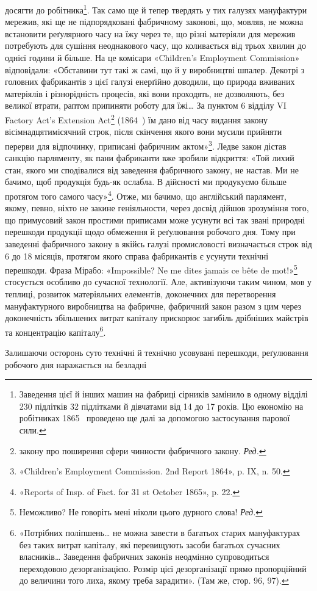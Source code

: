 \parcont{}  %
досягти до робітника\footnote{
Заведення цієї й інших машин на фабриці сірників замінило в
одному відділі  230 підлітків 32 підлітками й дівчатами від 14 до 17 років.
Цю економію на робітниках 1865~ проведено ще далі за допомогою застосування
парової сили.
}. Так само ще й тепер твердять у тих
галузях мануфактури мережив, які ще не підпорядковані фабричному
законові, що, мовляв, не можна встановити реґулярного
часу на їжу через те, що різні матеріяли для мережив потребують
для сушіння неоднакового часу, що коливається від трьох хвилин
до однієї години й більше. На це комісари «Children’s Employment
Commission» відповідали: «Обставини тут такі ж самі, що
й у виробництві шпалер. Декотрі з головних фабрикантів з цієї
галузі енерґійно доводили, що природа вживаних матеріялів і
різнорідність процесів, які вони проходять, не дозволяють, без великої
втрати, раптом припиняти роботу для їжі\dots{} За пунктом 6
відділу VI Factory Act’s Extension Act\footnote*{
закону про поширення сфери чинности фабричного закону. \emph{Ред.}
} (1864~) їм дано від
часу видання закону вісімнадцятимісячний строк, після скінчення
якого вони мусили прийняти перерви для відпочинку,
приписані фабричним актом»\footnote{
«Children’s Employment Commission. 2nd Report 1864», p. IX,
n. 50.
}. Ледве закон дістав санкцію
парляменту, як пани фабриканти вже зробили відкриття: «Той
лихий стан, якого ми сподівалися від заведення фабричного закону,
не настав. Ми не бачимо, щоб продукція будь-як ослабла.
В дійсності ми продукуємо більше протягом того самого часу»\footnote{
«Reports of Insp. of Fact. for 31 st October 1865», p. 22.
}.
Отже, ми бачимо, що англійський парлямент, якому, певно,
ніхто не закине геніяльности, через досвід дійшов зрозуміння
того, що примусовий закон простими приписами може усунути
всі так звані природні перешкоди продукції щодо обмеження
й реґулювання робочого дня. Тому при заведенні фабричного
закону в якійсь галузі промисловості визначається строк від 6
до 18 місяців, протягом якого справа фабрикантів є усунути
технічні перешкоди. Фраза Мірабо: «Impossible? Ne me dites
jamais ce bête de mot!»\footnote*{
Неможливо? Не говоріть мені ніколи цього дурного слова! \emph{Ред.}
} стосується особливо до сучасної технології.
Але, активізуючи таким чином, мов у теплиці, розвиток
матеріяльних елементів, доконечних для перетворення мануфактурного
виробництва на фабричне, фабричний закон разом з
цим через доконечність збільшених витрат капіталу прискорює
загибіль дрібніших майстрів та концентрацію капіталу\footnote{
«Потрібних поліпшень\dots{} не можна завести в багатьох старих
мануфактурах без таких витрат капіталу, які перевищують засоби багатьох
сучасних власників\dots{} Заведення фабричних законів неодмінно
супроводиться переходовою дезорганізацією. Розмір цієї дезорганізації
прямо пропорційний до величини того лиха, якому треба зарадити».
(Там же, стор. 96, 97).
}.

Залишаючи осторонь суто технічні й технічно усовувані
перешкоди, реґулювання робочого дня наражається на безладні
\parbreak{}  %
